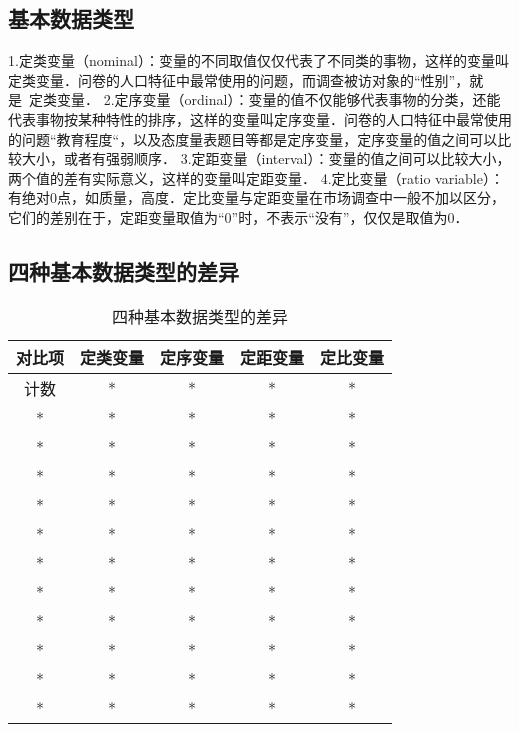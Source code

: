 \subsection{基本数据类型}
1.定类变量（nominal）：变量的不同取值仅仅代表了不同类的事物，这样的变量叫定类变量．问卷的人口特征中最常使用的问题，而调查被访对象的“性别”，就是 定类变量．
2.定序变量（ordinal）：变量的值不仅能够代表事物的分类，还能代表事物按某种特性的排序，这样的变量叫定序变量．问卷的人口特征中最常使用的问题“教育程度“，以及态度量表题目等都是定序变量，定序变量的值之间可以比较大小，或者有强弱顺序．
3.定距变量（interval）：变量的值之间可以比较大小，两个值的差有实际意义，这样的变量叫定距变量．
4.定比变量（ratio variable）：有绝对0点，如质量，高度．定比变量与定距变量在市场调查中一般不加以区分，它们的差别在于，定距变量取值为“0”时，不表示“没有”，仅仅是取值为0．
\subsection{四种基本数据类型的差异}
\begin{table}[ht]
\centering
\caption{四种基本数据类型的差异}\label{DatTyp_tab1}
\begin{tabular}{|c|c|c|c|c|}
\hline
对比项 & 定类变量 & 定序变量 & 定距变量 & 定比变量 \\
\hline
计数 & * & * & * & * \\
\hline
* & * & * & * & * \\
\hline
* & * & * & * & * \\
\hline
* & * & * & * & * \\
\hline
* & * & * & * & * \\
\hline
* & * & * & * & * \\
\hline
* & * & * & * & * \\
\hline
* & * & * & * & * \\
\hline
* & * & * & * & * \\
\hline
* & * & * & * & * \\
\hline
* & * & * & * & * \\
\hline
* & * & * & * & * \\
\hline
\end{tabular}
\end{table}
